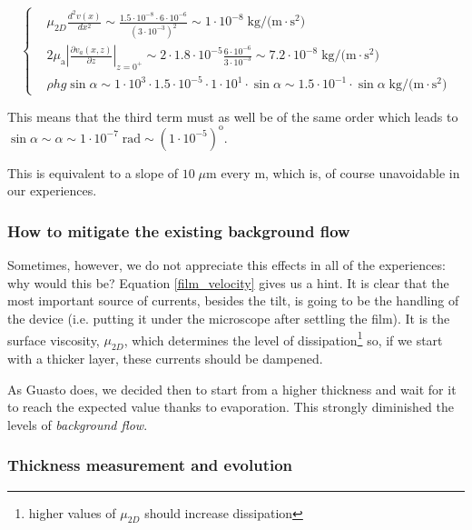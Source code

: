 \begin{equation}
\left\{
\begin{aligned}
& \mu_{2D} \frac{d^{2} v(x)}{d x^{2}} \sim \frac{1.5\cdot 10^{-8} \cdot 6\cdot 10^{-6}}{(3\cdot 10^{-3})^2} \sim 1\cdot 10^{-8} \; \textrm{kg/(m} \cdot \textrm{s}^\textrm{2} \textrm{)}\\
& 2 \mu_{\mathrm{a}}\left|\frac{\partial v_{a}(x, z)}{\partial z}\right|_{z=0^{+}} \sim 2 \cdot 1.8\cdot 10^{-5} \frac{6\cdot 10^{-6}}{3\cdot 10^{-3}} \sim 7.2\cdot 10^{-8} \; \textrm{kg/(m} \cdot \textrm{s}^\textrm{2} \textrm{)}\\
& \rho h g \sin \alpha \sim 1\cdot 10^{3} \cdot 1.5\cdot 10^{-5} \cdot 1\cdot 10^{1} \cdot \sin \alpha \sim 1.5\cdot 10^{-1} \cdot \sin \alpha \; \textrm{kg/(m} \cdot \textrm{s}^\textrm{2} \textrm{)} 
\end{aligned}
\right.
\end{equation}


This means that the third term must as well be of the same order which leads to $\sin \alpha \sim  \alpha \sim 1\cdot 10^{-7} \; \textrm{rad} \sim (1\cdot 10^{-5})^\textrm{o}$.

This is equivalent to a slope of $10 \; \mu \textrm{m}$ every $\textrm{m}$, which is, of course unavoidable in our experiences.

\subsubsection{How to mitigate the existing background flow}

Sometimes, however, we do not appreciate this effects in all of the experiences: why would this be? Equation \ref{film_velocity} gives us a hint. It is clear that the most important source of currents, besides the tilt, is going to be the handling of the device (i.e. putting it under the microscope after settling the film). It is the surface viscosity, $\mu_{2D}$, which determines the level of dissipation\footnote{higher values of $\mu_{2D}$ should increase dissipation} so, if we start with a thicker layer, these currents should be dampened.

As Guasto does, we decided then to start from a higher thickness and wait for it to reach the expected value thanks to evaporation. This strongly diminished the levels of \textit{background flow}.

\subsubsection{Thickness measurement and evolution}

